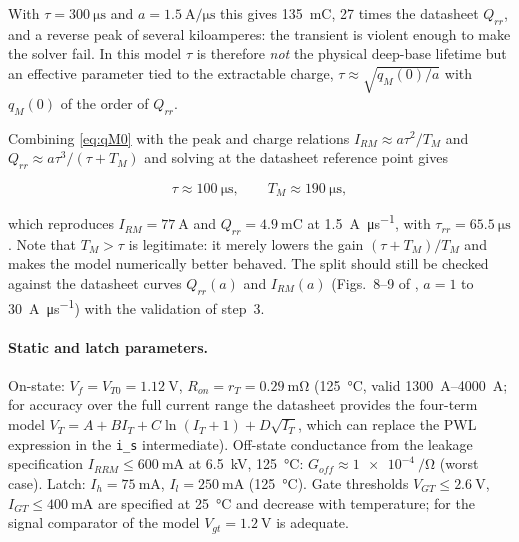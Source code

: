 \documentclass[11pt,a4paper]{article}
\begin{document}
With $\tau = \SI{300}{\micro\second}$ and
$a = \SI{1.5}{\ampere\per\micro\second}$ this gives \SI{135}{\milli\coulomb},
27 times the datasheet $Q_{rr}$, and a reverse peak of several kiloamperes:
the transient is violent enough to make the solver fail. In this model $\tau$
is therefore \emph{not} the physical deep-base lifetime but an effective
parameter tied to the extractable charge, $\tau \approx \sqrt{q_M(0)/a}$ with
$q_M(0)$ of the order of $Q_{rr}$.

Combining \eqref{eq:qM0} with the peak and charge relations
$I_{RM} \approx a\tau^2/T_M$ and $Q_{rr} \approx a\tau^3/(\tau + T_M)$ and
solving at the datasheet reference point gives

\begin{equation}
  \tau \approx \SI{100}{\micro\second}, \qquad
  T_M \approx \SI{190}{\micro\second},
\end{equation}

which reproduces $I_{RM} = \SI{77}{\ampere}$ and
$Q_{rr} = \SI{4.9}{\milli\coulomb}$ at
\SI{1.5}{\ampere\per\micro\second}, with
$\tau_{rr} = \SI{65.5}{\micro\second}$. Note that $T_M > \tau$ is
legitimate: it merely lowers the gain $(\tau+T_M)/T_M$ and makes the model
numerically better behaved. The split should still be checked against the
datasheet curves $Q_{rr}(a)$ and $I_{RM}(a)$ (Figs.~8--9 of
\cite{abb26n6500}, $a = 1$ to \SI{30}{\ampere\per\micro\second}) with the
validation of step~3.

\paragraph{Static and latch parameters.} On-state:
$V_f = V_{T0} = \SI{1.12}{\volt}$, $R_{on} = r_T = \SI{0.29}{\milli\ohm}$
(\SI{125}{\celsius}, valid \SIrange{1300}{4000}{\ampere}; for accuracy over
the full current range the datasheet provides the four-term model
$V_T = A + B I_T + C \ln(I_T+1) + D\sqrt{I_T}$, which can replace the PWL
expression in the \texttt{i\_s} intermediate). Off-state conductance from
the leakage specification $I_{RRM} \le \SI{600}{\milli\ampere}$ at
\SI{6.5}{\kilo\volt}, \SI{125}{\celsius}:
$G_{off} \approx \SI{1e-4}{\per\ohm}$ (worst case). Latch:
$I_h = \SI{75}{\milli\ampere}$, $I_l = \SI{250}{\milli\ampere}$
(\SI{125}{\celsius}). Gate thresholds $V_{GT} \le \SI{2.6}{\volt}$,
$I_{GT} \le \SI{400}{\milli\ampere}$ are specified at \SI{25}{\celsius}
and decrease with temperature; for the signal comparator of the model
$V_{gt} = \SI{1.2}{\volt}$ is adequate.
\end{document}

